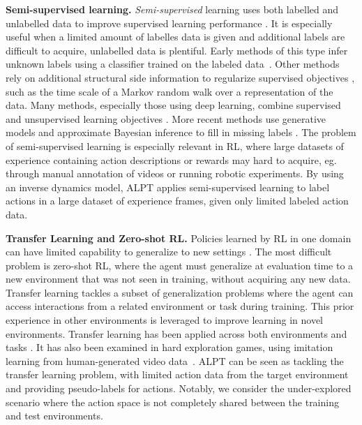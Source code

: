 \documentclass{article} %
\begin{document}
\textbf{Semi-supervised learning.} \emph{Semi-supervised} learning uses both labelled and unlabelled data to improve supervised learning performance \citep{10.5555/1717872}. It is especially useful when a limited amount of labelles data is given and additional labels are difficult to acquire,  unlabelled data is plentiful.  Early methods of this type infer unknown labels using a classifier trained on the labeled data~\citep{Zhu02learningfrom}.  Other methods rely on additional structural side information to regularize supervised objectives \citep{NIPS2001_a82d922b}, such as the time scale of a Markov random walk over a representation of the data.  Many methods, especially those using deep learning, combine supervised and unsupervised learning objectives \citep{10.5555/2969442.2969635}.  More recent methods use generative models and approximate Bayesian inference to fill in missing labels \citep{10.5555/2969033.2969226}.  The problem of semi-supervised learning is especially relevant in RL, where large datasets of experience containing action descriptions or rewards may  hard to acquire, eg. through manual annotation of videos or running robotic experiments. 
By using an inverse dynamics model, ALPT applies semi-supervised learning to label actions in a large dataset of experience frames, given only limited labeled action data.

\textbf{Transfer Learning and Zero-shot RL.} Policies learned by RL in one domain can have limited capability to generalize to new settings \citep{10.5555/3045390.3045684}. The most difficult problem is zero-shot RL, where the agent must generalize  at evaluation time to a new environment that was not seen in training, without acquiring any new data.  Transfer learning \citep{JMLR:v10:taylor09a}  tackles a subset of generalization problems where the agent can access interactions from a related environment or task during training.  This prior experience in other environments is leveraged to improve learning in novel environments.  Transfer learning has been applied across both environments \citep{7487140, Tzeng2020} and tasks \citep{policydist,ParisottoBS15}.  It has also been examined in hard exploration games, using imitation learning from human-generated video data~\citep{10.5555/3327144.3327216}.  ALPT can be seen as tackling the transfer learning problem, with limited action data from the target environment and providing pseudo-labels for actions. Notably, we consider the under-explored scenario where the action space is not completely shared between the training and test environments.
\end{document}
